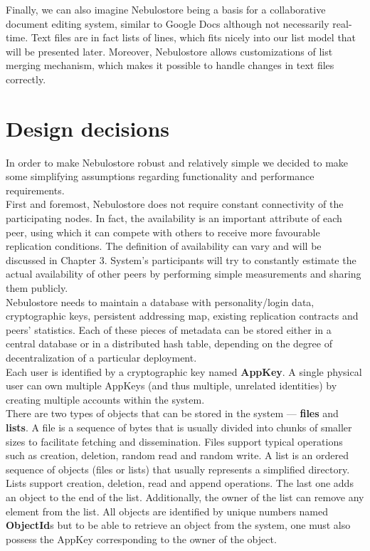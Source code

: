 \documentclass{pracamgren}
\begin{document}
Finally, we can also imagine Nebulostore being a basis for a collaborative document editing system, similar to Google Docs although not necessarily real-time. Text files are in fact lists of lines, which fits nicely into our list model that will be presented later. Moreover, Nebulostore allows customizations of list merging mechanism, which makes it possible to handle changes in text files correctly.\\

\section{Design decisions}

In order to make Nebulostore robust and relatively simple we decided to make some simplifying assumptions regarding functionality and performance requirements.\\

First and foremost, Nebulostore does not require constant connectivity of the participating nodes. In fact, the availability is an important attribute of each peer, using which it can compete with others to receive more favourable replication conditions. The definition of availability can vary and will be discussed in Chapter 3. System's participants will try to constantly estimate the actual availability of other peers by performing simple measurements and sharing them publicly.\\

Nebulostore needs to maintain a database with personality/login data, cryptographic keys, persistent addressing map, existing replication contracts and peers' statistics. Each of these pieces of metadata can be stored either in a central database or in a distributed hash table, depending on the degree of decentralization of a particular deployment.\\

Each user is identified by a cryptographic key named {\bf AppKey}. A single physical user can own multiple AppKeys (and thus multiple, unrelated identities) by creating multiple accounts within the system.\\

There are two types of objects that can be stored in the system --- {\bf files} and {\bf lists}. A file is a sequence of bytes that is usually divided into chunks of smaller sizes to facilitate fetching and dissemination. Files support typical operations such as creation, deletion, random read and random write. A list is an ordered sequence of objects (files or lists) that usually represents a simplified directory. Lists support creation, deletion, read and append operations. The last one adds an object to the end of the list. Additionally, the owner of the list can remove any element from the list. All objects are identified by unique numbers named {\bf ObjectId}s but to be able to retrieve an object from the system, one must also possess the AppKey corresponding to the owner of the object.\\
\end{document}

